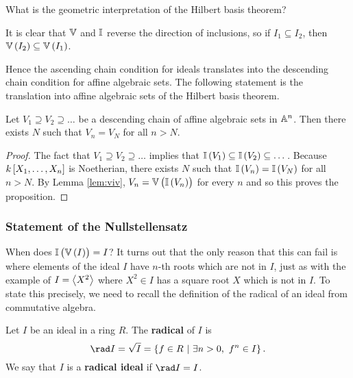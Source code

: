 What is the geometric interpretation of the Hilbert basis theorem?

\begin{note*}
It is clear that $ \VV $ and $ \II $ reverse the direction of inclusions, so if $ I_1 \subseteq I_2 $, then $ \VV\br{I_2} \subseteq \VV\br{I_1} $.
\end{note*}

Hence the ascending chain condition for ideals translates into the descending chain condition for affine algebraic sets. The following statement is the translation into affine algebraic sets of the Hilbert basis theorem.

\begin{lemma}
\label{lem:descendingchain}
Let $ V_1 \supseteq V_2 \supseteq \dots $ be a descending chain of affine algebraic sets in $ \AA^n $. Then there exists $ N $ such that $ V_n = V_N $ for all $ n > N $.
\end{lemma}

\begin{proof}
The fact that $ V_1 \supseteq V_2 \supseteq \dots $ implies that $ \II\br{V_1} \subseteq \II\br{V_2} \subseteq \dots $. Because $ k\sbr{X_1, \dots, X_n} $ is Noetherian, there exists $ N $ such that $ \II\br{V_n} = \II\br{V_N} $ for all $ n > N $. By Lemma \ref{lem:viv}, $ V_n = \VV\br{\II\br{V_n}} $ for every $ n $ and so this proves the proposition.
\end{proof}

\pagebreak

\subsubsection{Statement of the Nullstellensatz}

When does $ \II\br{\VV\br{I}} = I $? It turns out that the only reason that this can fail is where elements of the ideal $ I $ have $ n $-th roots which are not in $ I $, just as with the example of $ I = \abr{X^2} $ where $ X^2 \in I $ has a square root $ X $ which is not in $ I $. To state this precisely, we need to recall the definition of the radical of an ideal from commutative algebra.

\begin{definition*}
Let $ I $ be an ideal in a ring $ R $. The \textbf{radical} of $ I $ is
$$ \rad I = \sqrt{I} = \cbr{f \in R \st \exists n > 0, \ f^n \in I}. $$
We say that $ I $ is a \textbf{radical ideal} if $ \rad I = I $.
\end{definition*}

